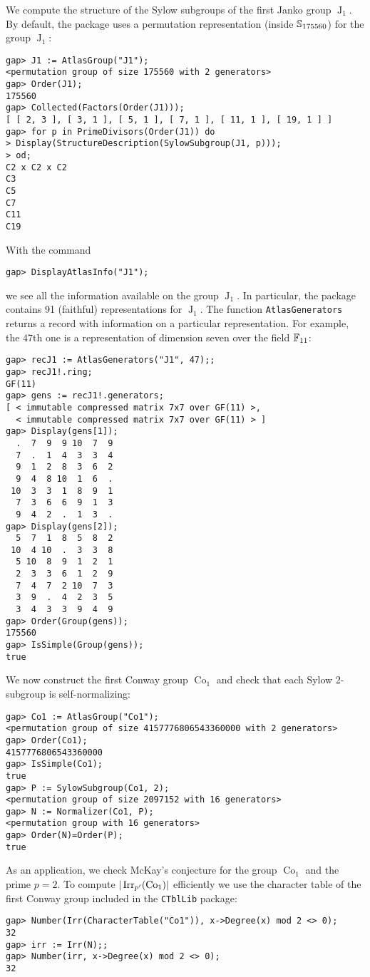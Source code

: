 \begin{example}
We compute the structure
of the Sylow subgroups of the first Janko group $\operatorname{J}_1$. By default, 
the package uses a permutation representation (inside $\mathbb{S}_{175560}$) 
for the group $\operatorname{J}_1$: 
\begin{lstlisting}
gap> J1 := AtlasGroup("J1");
<permutation group of size 175560 with 2 generators>
gap> Order(J1);
175560
gap> Collected(Factors(Order(J1)));
[ [ 2, 3 ], [ 3, 1 ], [ 5, 1 ], [ 7, 1 ], [ 11, 1 ], [ 19, 1 ] ]
gap> for p in PrimeDivisors(Order(J1)) do
> Display(StructureDescription(SylowSubgroup(J1, p)));
> od;
C2 x C2 x C2
C3
C5
C7
C11
C19
\end{lstlisting}
With the command
\begin{lstlisting}
gap> DisplayAtlasInfo("J1");
\end{lstlisting}
we see all the information available on the group
$\operatorname{J}_1$. In particular, 
the package contains 91 (faithful) representations 
for $\operatorname{J}_1$. The function
\lstinline{AtlasGenerators} returns
a record with information on a particular representation. 
For example, the 47th one is a representation
of dimension seven over the field $\mathbb{F}_{11}$: 
\begin{lstlisting}
gap> recJ1 := AtlasGenerators("J1", 47);;
gap> recJ1!.ring;
GF(11)
gap> gens := recJ1!.generators;
[ < immutable compressed matrix 7x7 over GF(11) >,
  < immutable compressed matrix 7x7 over GF(11) > ]
gap> Display(gens[1]);
  .  7  9  9 10  7  9
  7  .  1  4  3  3  4
  9  1  2  8  3  6  2
  9  4  8 10  1  6  .
 10  3  3  1  8  9  1
  7  3  6  6  9  1  3
  9  4  2  .  1  3  .
gap> Display(gens[2]);
  5  7  1  8  5  8  2
 10  4 10  .  3  3  8
  5 10  8  9  1  2  1
  2  3  3  6  1  2  9
  7  4  7  2 10  7  3
  3  9  .  4  2  3  5
  3  4  3  3  9  4  9
gap> Order(Group(gens));
175560
gap> IsSimple(Group(gens));
true
\end{lstlisting}
\end{example}

\begin{example}
    We now construct the first Conway group
    $\operatorname{Co}_1$ and check that 
    each Sylow 2-subgroup is self-normalizing:
\begin{lstlisting}
gap> Co1 := AtlasGroup("Co1");
<permutation group of size 4157776806543360000 with 2 generators>
gap> Order(Co1);
4157776806543360000
gap> IsSimple(Co1);
true
gap> P := SylowSubgroup(Co1, 2);
<permutation group of size 2097152 with 16 generators>
gap> N := Normalizer(Co1, P);
<permutation group with 16 generators>
gap> Order(N)=Order(P);
true
\end{lstlisting}
As an application, we check 
McKay's conjecture for the group $\operatorname{Co}_1$ 
and the prime $p=2$. To compute
$|\operatorname{Irr}_{p'}(\operatorname{Co}_1)|$ efficiently
we use the character table of 
the first Conway group
included in the \lstinline{CTblLib} package:

\begin{lstlisting}
gap> Number(Irr(CharacterTable("Co1")), x->Degree(x) mod 2 <> 0);
32
gap> irr := Irr(N);;
gap> Number(irr, x->Degree(x) mod 2 <> 0);
32
\end{lstlisting}
\end{example}


